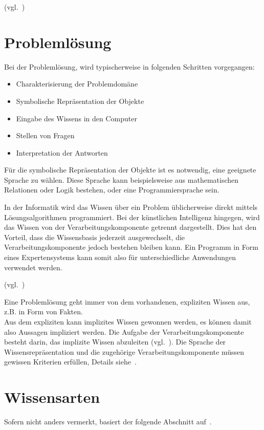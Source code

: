 (vgl.~\cite[S. 23]{laemmel})

\newpage

\section{Problemlösung}
\label{sec:experten_systeme_problemloesung}
Bei der Problemlösung, wird typischerweise in folgenden Schritten vorgegangen:
\begin{itemize}
    \item Charakterisierung der Problemdomäne
    \item Symbolische Repräsentation der Objekte
    \item Eingabe des Wissens in den Computer
    \item Stellen von Fragen
    \item Interpretation der Antworten
\end{itemize}

Für die symbolische Repräsentation der Objekte ist es notwendig, eine geeignete Sprache zu wählen. Diese Sprache kann beispielsweise aus mathematischen Relationen oder Logik bestehen, oder eine Programmiersprache sein.

In der Informatik wird das Wissen über ein Problem üblicherweise direkt mittels Lösungsalgorithmen programmiert. Bei der künstlichen Intelligenz hingegen, wird das Wissen von der Verarbeitungskomponente getrennt dargestellt. Dies hat den Vorteil, dass die Wissensbasis jederzeit ausgewechselt, die Verarbeitungskomponente jedoch bestehen bleiben kann. Ein Programm in Form eines Expertensystems kann somit also für unterschiedliche Anwendungen verwendet werden.

(vgl.~\cite[S. 28 - 30]{laemmel})

Eine Problemlösung geht immer von dem vorhandenen, expliziten Wissen aus, z.B. in Form von Fakten.\\
Aus dem expliziten kann implizites Wissen gewonnen werden, es können damit also Aussagen impliziert werden. Die Aufgabe der Verarbeitungskomponente besteht darin, das implizite Wissen abzuleiten (vgl.~\cite[S. 30 - 31]{laemmel}). Die Sprache der Wissensrepräsentation und die zugehörige Verarbeitungskomponente müssen gewissen Kriterien erfüllen, Details siehe~\cite[S. 31]{laemmel}.

\section{Wissensarten}
\label{sec:experten_systeme_wissensarten}
Sofern nicht anders vermerkt, basiert der folgende Abschnitt auf~\cite[S. 30 - 31]{laemmel}.

